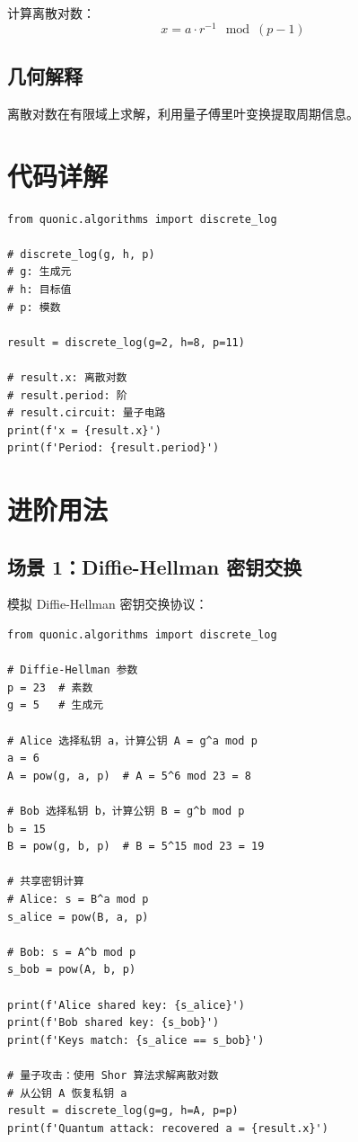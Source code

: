 \documentclass[12pt,a4paper]{article}
\begin{document}
计算离散对数：
\begin{equation}
x = a \cdot r^{-1} \mod (p-1)
\end{equation}

\subsection{几何解释}

离散对数在有限域上求解，利用量子傅里叶变换提取周期信息。

\section{代码详解}

\begin{verbatim}
from quonic.algorithms import discrete_log

# discrete_log(g, h, p)
# g: 生成元
# h: 目标值
# p: 模数

result = discrete_log(g=2, h=8, p=11)

# result.x: 离散对数
# result.period: 阶
# result.circuit: 量子电路
print(f'x = {result.x}')
print(f'Period: {result.period}')
\end{verbatim}

\section{进阶用法}

\subsection{场景 1：Diffie-Hellman 密钥交换}

模拟 Diffie-Hellman 密钥交换协议：

\begin{verbatim}
from quonic.algorithms import discrete_log

# Diffie-Hellman 参数
p = 23  # 素数
g = 5   # 生成元

# Alice 选择私钥 a，计算公钥 A = g^a mod p
a = 6
A = pow(g, a, p)  # A = 5^6 mod 23 = 8

# Bob 选择私钥 b，计算公钥 B = g^b mod p
b = 15
B = pow(g, b, p)  # B = 5^15 mod 23 = 19

# 共享密钥计算
# Alice: s = B^a mod p
s_alice = pow(B, a, p)

# Bob: s = A^b mod p
s_bob = pow(A, b, p)

print(f'Alice shared key: {s_alice}')
print(f'Bob shared key: {s_bob}')
print(f'Keys match: {s_alice == s_bob}')

# 量子攻击：使用 Shor 算法求解离散对数
# 从公钥 A 恢复私钥 a
result = discrete_log(g=g, h=A, p=p)
print(f'Quantum attack: recovered a = {result.x}')
\end{verbatim}
\end{document}
